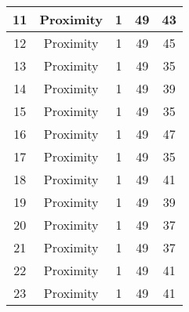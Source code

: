 \documentclass[results.tex]{subfiles}
\begin{document}
\begin{center}
\begin{tabular}{| c || c | c | c | c |}
            \hline
            11                      & Proximity                    & 1                      & 49                      & 43                   \\
            \hline
            12                      & Proximity                    & 1                      & 49                      & 45                   \\
            \hline
            13                      & Proximity                    & 1                      & 49                      & 35                   \\
            \hline
            14                      & Proximity                    & 1                      & 49                      & 39                   \\
            \hline
            15                      & Proximity                    & 1                      & 49                      & 35                   \\
            \hline
            16                      & Proximity                    & 1                      & 49                      & 47                   \\
            \hline
            17                      & Proximity                    & 1                      & 49                      & 35                   \\
            \hline
            18                      & Proximity                    & 1                      & 49                      & 41                   \\
            \hline
            19                      & Proximity                    & 1                      & 49                      & 39                   \\
            \hline
            20                      & Proximity                    & 1                      & 49                      & 37                   \\
            \hline
            21                      & Proximity                    & 1                      & 49                      & 37                   \\
            \hline
            22                      & Proximity                    & 1                      & 49                      & 41                   \\
            \hline
            23                      & Proximity                    & 1                      & 49                      & 41                   \\

\end{tabular}
\end{center}
\end{document}
